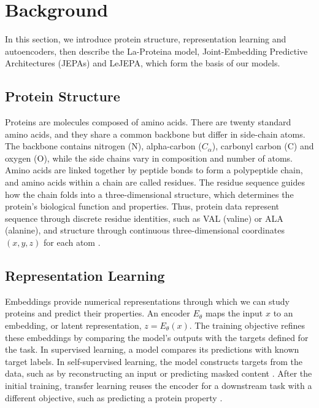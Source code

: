 

\section{Background}
\label{sec:background}

In this section, we introduce protein structure, representation learning and autoencoders, then describe the La-Proteina model, Joint-Embedding Predictive Architectures (JEPAs) and LeJEPA, which form the basis of our models.

\subsection{Protein Structure}
\label{sec:background-proteins}
Proteins are molecules composed of amino acids. There are twenty standard amino acids, and they share a common backbone but differ in side-chain atoms. The backbone contains nitrogen (N), alpha-carbon ($C_\alpha$), carbonyl carbon (C) and oxygen (O), while the side chains vary in composition and number of atoms. Amino acids are linked together by peptide bonds to form a polypeptide chain, and amino acids within a chain are called residues. The residue sequence guides how the chain folds into a three-dimensional structure, which determines the protein's biological function and properties. Thus, protein data represent sequence through discrete residue identities, such as VAL (valine) or ALA (alanine), and structure through continuous three-dimensional coordinates $(x,y,z)$ for each atom \citep{la-proteina}.



\subsection{Representation Learning}
\label{sec:background-representation-learning}

Embeddings provide numerical representations through which we can study proteins and predict their properties. An encoder $E_\theta$ maps the input $x$ to an embedding, or latent representation, $z=E_\theta(x)$.
The training objective refines these embeddings by comparing the model's outputs with the targets defined for the task. In supervised learning, a model compares its predictions with known target labels.
In self-supervised learning, the model constructs targets from the data, such as by reconstructing an input or predicting masked content \citep{assran2023ijepa,caron2021dino}.
After the initial training, transfer learning reuses the encoder for a downstream task with a different objective, such as predicting a protein property \citep{rao2019tape}.

